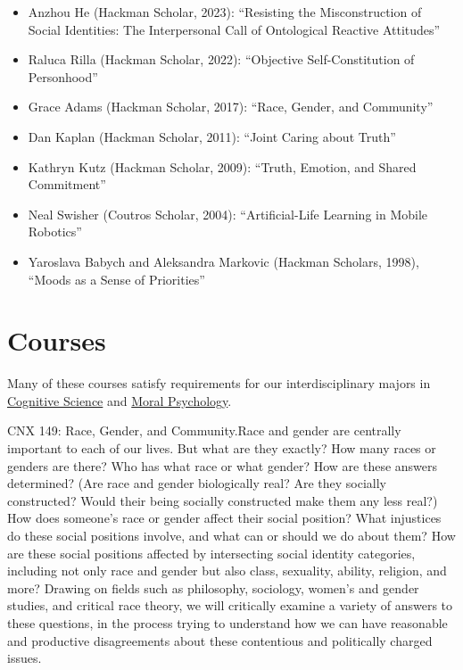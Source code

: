 \documentclass[%
  11pt,%
]{article}
\begin{document}
\begin{itemize}

  \item Anzhou He (Hackman Scholar, 2023): \enquote{Resisting the Misconstruction of Social Identities: The Interpersonal Call of Ontological Reactive Attitudes}
  \item Raluca Rilla (Hackman Scholar, 2022): \enquote{Objective Self-Constitution of Personhood}
  \item Grace Adams (Hackman Scholar, 2017): \enquote{Race, Gender, and Community}
  \item Dan Kaplan (Hackman Scholar, 2011): \enquote{Joint Caring about Truth}
  \item Kathryn Kutz (Hackman Scholar, 2009): \enquote{Truth, Emotion, and Shared Commitment}
  \item Neal Swisher (Coutros Scholar, 2004): \enquote{Artificial-Life Learning in Mobile Robotics}
  \item Yaroslava Babych and Aleksandra Markovic (Hackman Scholars, 1998), \enquote{Moods as a Sense of Priorities}

\end{itemize}

\section{Courses}

Many of these courses satisfy requirements for our interdisciplinary majors in \href{https://www.fandm.edu/fields-of-study/cognitive-science/index.html}{Cognitive Science} and \href{https://www.fandm.edu/fields-of-study/moral-psychology/index.html}{Moral Psychology}.
\medskip{}

\begin{htmlcourse}{CNX 149: Race, Gender, and Community.}{Race and gender are centrally important to each of our lives. But what are they exactly? How many races or genders are there? Who has what race or what gender? How are these answers determined? (Are race and gender biologically real? Are they socially constructed? Would their being socially constructed make them any less real?) How does someone's race or gender affect their social position? What injustices do these social positions involve, and what can or should we do about them? How are these social positions affected by intersecting social identity categories, including not only race and gender but also class, sexuality, ability, religion, and more? Drawing on fields such as philosophy, sociology, women's and gender studies, and critical race theory, we will critically examine a variety of answers to these questions, in the process trying to understand how we can have reasonable and productive disagreements about these contentious and politically charged issues.}\end{htmlcourse}
\end{document}

